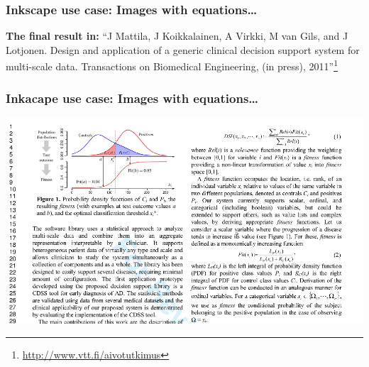 \documentclass[13pt]{beamer}
\begin{document}
\begin{frame}[fragile]
\frametitle{Inkscape use case: Images with equations\ldots}
\hspace*{-1em}%
\end{frame}

\begin{frame}[fragile]
\parbox{0.8\textwidth}{\tiny
\textbf{The final result in:} ``J Mattila, J Koikkalainen, A Virkki,
M van Gils, and J Lotjonen. Design and application of a generic clinical 
decision support system for multi-scale data. Transactions on Biomedical
Engineering, (in press), 2011''\footnote{\url{http://www.vtt.fi/aivotutkimus}}
\frametitle{Inkacape use case: Images with equations\ldots}}
\includegraphics[width=1\textwidth]{img/textext_publ.png}
\end{frame}
\end{document}
